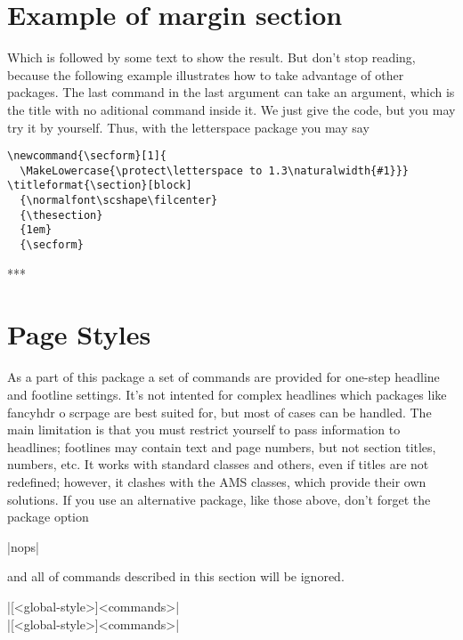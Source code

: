 \documentclass{ltxguide}
\begin{document}
\section*{Example of margin section}

Which is followed by some text to show the result.
But don't stop reading, because the following example illustrates how
to take advantage of other packages. The last command in the last
argument can take an argument, which is the title with no
aditional command inside it. We just give the code, but you
may try it by yourself. Thus, with the \textsf{letterspace} package
you may say
\begin{verbatim}
\newcommand{\secform}[1]{
  \MakeLowercase{\protect\letterspace to 1.3\naturalwidth{#1}}}
\titleformat{\section}[block]
  {\normalfont\scshape\filcenter}
  {\thesection}
  {1em}
  {\secform}
\end{verbatim}

\endgroup

\smallskip
\begin{center}
*\hspace{3pc}*\hspace{3pc}*
\end{center}
\bigskip

\section{Page Styles}

As a part of this package a set of commands are provided for one-step
headline and footline settings.  It's not intented for complex headlines 
which packages like \textsf{fancyhdr} o \textsf{scrpage}
are best suited for, but most of 
cases can be handled. The main limitation is that you must restrict 
yourself to pass information to headlines; footlines may contain text 
and page numbers, but not section titles, numbers, etc. It works with
standard classes and others, even if titles are not redefined;
however, it clashes with the \textsc{AMS} classes, which provide
their own solutions. If you use an alternative package, like those
above, don't forget the package option
\begin{decl}
|nops|
\end{decl}
and all of commands described in this section will be ignored. 

\begin{decl}
|[<global-style>]{<commands>}|\\
|[<global-style>]{<commands>}|
\end{decl}
\end{document}
